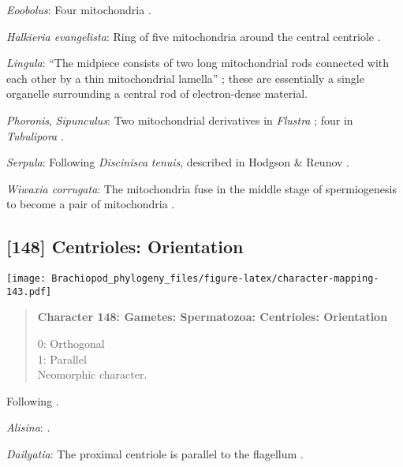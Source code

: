 \documentclass[openany]{book}
\theoremstyle{definition}
\theoremstyle{definition}
\theoremstyle{definition}
\theoremstyle{remark}
\begin{document}
\hypertarget{Eoobolus-coding-147}{}
\emph{Eoobolus}: Four mitochondria \citep{Afzelius1978Finestructure}.

\hypertarget{Halkieria_evangelista-coding-147}{}
\emph{Halkieria evangelista}: Ring of five mitochondria around the
central centriole \citep{Rice1993}.

\hypertarget{Lingula-coding-147}{}
\emph{Lingula}: ``The midpiece consists of two long mitochondrial rods
connected with each other by a thin mitochondrial lamella'' \citep[in
\emph{Loxosoma}]{Franzen2000}; these are essentially a single organelle
surrounding a central rod of electron-dense material.

\hypertarget{Phoronis-coding-147}{}
\emph{Phoronis}, \emph{Sipunculus}: Two mitochondrial derivatives in
\emph{Flustra} \citep{Franzen1981, Franzen1977}; four in
\emph{Tubulipora} \citep{Franzen1984}.

\hypertarget{Serpula-coding-147}{}
\emph{Serpula}: Following \emph{Discinisca} \emph{tenuis}, described in
Hodgson \& Reunov \citeyearpar{Hodgson1994Ultrastructureof}.

\hypertarget{Wiwaxia_corrugata-coding-147}{}
\emph{Wiwaxia corrugata}: The mitochondria fuse in the middle stage of
spermiogenesis to become a pair of mitochondria
\citep{Reunov2004Ultrastructuralstudy}.

\subsection*{{[}148{]} Centrioles:
Orientation}\label{centrioles-orientation}

\texttt{[image: Brachiopod\_phylogeny\_files/figure-latex/character-mapping-143.pdf]}

\begin{quote}
\textbf{Character 148: Gametes: Spermatozoa: Centrioles: Orientation}

0: Orthogonal\\
1: Parallel\\
Neomorphic character.
\end{quote}

Following \citet{Hodgson1994Ultrastructureof}.

\hypertarget{Alisina-coding-148}{}
\emph{Alisina}: \citet{DufresneDube1983}.

\hypertarget{Dailyatia-coding-148}{}
\emph{Dailyatia}: The proximal centriole is parallel to the flagellum
\citep{Gherardi2011}.
\end{document}
